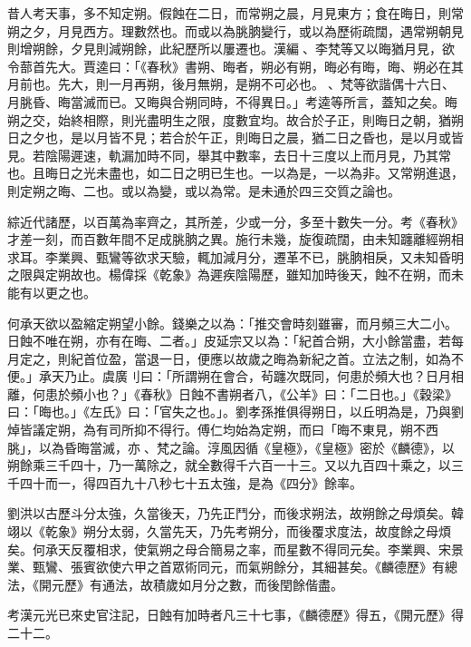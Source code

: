 \begin{pinyinscope}
 昔人考天事，多不知定朔。假蝕在二日，而常朔之晨，月見東方；食在晦日，則常朔之夕，月見西方。理數然也。而或以為朓朒變行，或以為歷術疏闊，遇常朔朝見則增朔餘，夕見則減朔餘，此紀歷所以屢遷也。漢編、李梵等又以晦猶月見，欲令蔀首先大。賈逵曰：「《春秋》書朔、晦者，朔必有朔，晦必有晦，晦、朔必在其月前也。先大，則一月再朔，後月無朔，是朔不可必也。、梵等欲諧偶十六日、月朓昏、晦當滅而已。又晦與合朔同時，不得異日。」考逵等所言，蓋知之矣。晦朔之交，始終相際，則光盡明生之限，度數宜均。故合於子正，則晦日之朝，猶朔日之夕也，是以月皆不見；若合於午正，則晦日之晨，猶二日之昏也，是以月或皆見。若陰陽遲速，軌漏加時不同，舉其中數率，去日十三度以上而月見，乃其常也。且晦日之光未盡也，如二日之明已生也。一以為是，一以為非。又常朔進退，則定朔之晦、二也。或以為變，或以為常。是未通於四三交質之論也。



 綜近代諸歷，以百萬為率齊之，其所差，少或一分，多至十數失一分。考《春秋》才差一刻，而百數年間不足成朓朒之異。施行未幾，旋復疏闊，由未知躔離經朔相求耳。李業興、甄鸞等欲求天驗，輒加減月分，遷革不已，朓朒相戾，又未知昏明之限與定朔故也。楊偉採《乾象》為遲疾陰陽歷，雖知加時後天，蝕不在朔，而未能有以更之也。



 何承天欲以盈縮定朔望小餘。錢樂之以為：「推交會時刻雖審，而月頻三大二小。日蝕不唯在朔，亦有在晦、二者。」皮延宗又以為：「紀首合朔，大小餘當盡，若每月定之，則紀首位盈，當退一日，便應以故歲之晦為新紀之首。立法之制，如為不便。」承天乃止。虞廣刂曰：「所謂朔在會合，茍躔次既同，何患於頻大也？日月相離，何患於頻小也？」《春秋》日蝕不書朔者八，《公羊》曰：「二日也。」《穀梁》曰：「晦也。」《左氏》曰：「官失之也。」。劉孝孫推俱得朔日，以丘明為是，乃與劉焯皆議定朔，為有司所抑不得行。傅仁均始為定朔，而曰「晦不東見，朔不西朓」，以為昏晦當滅，亦、梵之論。淳風因循《皇極》，《皇極》密於《麟德》，以朔餘乘三千四十，乃一萬除之，就全數得千六百一十三。又以九百四十乘之，以三千四十而一，得四百九十八秒七十五太強，是為《四分》餘率。



 劉洪以古歷斗分太強，久當後天，乃先正鬥分，而後求朔法，故朔餘之母煩矣。韓翊以《乾象》朔分太弱，久當先天，乃先考朔分，而後覆求度法，故度餘之母煩矣。何承天反覆相求，使氣朔之母合簡易之率，而星數不得同元矣。李業興、宋景業、甄鸞、張賓欲使六甲之首眾術同元，而氣朔餘分，其細甚矣。《麟德歷》有總法，《開元歷》有通法，故積歲如月分之數，而後閏餘偕盡。



 考漢元光已來史官注記，日蝕有加時者凡三十七事，《麟德歷》得五，《開元歷》得二十二。




\end{pinyinscope}
